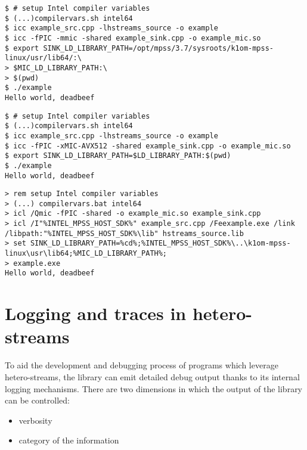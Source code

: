 \documentclass[a4,oneside]{book}
\begin{document}
\begin{lstlisting}[style=BashCmdListingStyle,caption={Compiling and running the example on Linux on KNC card},frame=tlrb,label={lst:running-example-linux-knc}]
$ # setup Intel compiler variables
$ (...)compilervars.sh intel64
$ icc example_src.cpp -lhstreams_source -o example
$ icc -fPIC -mmic -shared example_sink.cpp -o example_mic.so
$ export SINK_LD_LIBRARY_PATH=/opt/mpss/3.7/sysroots/k1om-mpss-linux/usr/lib64/:\
> $MIC_LD_LIBRARY_PATH:\
> $(pwd)
$ ./example
Hello world, deadbeef
\end{lstlisting}

\begin{lstlisting}[style=BashCmdListingStyle,caption={Compiling and running the example on Linux on x200 card},frame=tlrb,label={lst:running-example-linux-x200}]
$ # setup Intel compiler variables
$ (...)compilervars.sh intel64
$ icc example_src.cpp -lhstreams_source -o example
$ icc -fPIC -xMIC-AVX512 -shared example_sink.cpp -o example_mic.so
$ export SINK_LD_LIBRARY_PATH=$LD_LIBRARY_PATH:$(pwd)
$ ./example
Hello world, deadbeef
\end{lstlisting}


\begin{lstlisting}[style=BatchListingStyle,caption={Compiling and running the example on Windows},frame=tlrb,label={lst:running-example-windows}]
> rem setup Intel compiler variables
> (...) compilervars.bat intel64
> icl /Qmic -fPIC -shared -o example_mic.so example_sink.cpp
> icl /I"%INTEL_MPSS_HOST_SDK%" example_src.cpp /Feexample.exe /link /libpath:"%INTEL_MPSS_HOST_SDK%\lib" hstreams_source.lib
> set SINK_LD_LIBRARY_PATH=%cd%;%INTEL_MPSS_HOST_SDK%\..\k1om-mpss-linux\usr\lib64;%MIC_LD_LIBRARY_PATH%;
> example.exe
Hello world, deadbeef
\end{lstlisting}

\section{Logging and traces in hetero-streams}
To aid the development and debugging process of programs which leverage hetero-streams, the library can emit detailed debug output thanks to its internal logging mechanisms.
There are two dimensions in which the output of the library can be controlled:
\begin{itemize}
    \item verbosity
    \item category of the information
\end{itemize}
\end{document}
